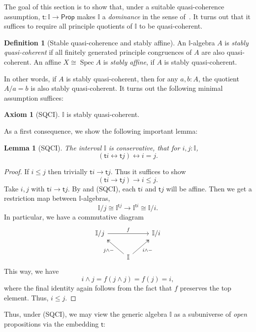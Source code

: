 \documentclass[12pt]{amsart}
\newtheorem{lemma}[theorem]{Lemma}
\theoremstyle{definition}
\newtheorem{definition}[theorem]{Definition}
\newtheorem*{axiom}{Axiom}
\newcommand{\mbb}[1]{\mathbb{#1}}
\newcommand{\I}{\mbb I}
\newcommand{\ms}[1]{\mathsf{#1}}
\newcommand{\eq}{\leftrightarrow}
\newcommand{\pp}{\ms{Prop}}
\newcommand{\spec}{\operatorname{Spec}}
\begin{document}
The goal of this section is to show that, under a suitable quasi-coherence assumption, $\ms t : \I \to \pp$ makes $\I$ a \emph{dominance} in the sense of~\cite{rosolini1986continuity}. It turns out that it suffices to require all principle quotients of $\I$ to be quasi-coherent.

\begin{definition}[Stable quasi-coherence and stably affine]
  An $\I$-algebra $A$ is \emph{stably quasi-coherent} if all finitely generated principle congruences of $A$ are also quasi-coherent. An affine $X \cong \spec A$ is \emph{stably affine}, if $A$ is stably quasi-coherent.
\end{definition}

In other words, if $A$ is stably quasi-coherent, then for any $a,b:A$, the quotient $A/a=b$ is also stably quasi-coherent. It turns out the following minimal assumption suffices:

\begin{axiom}[SQCI]\label{ax:sqci}
  $\I$ is stably quasi-coherent.
\end{axiom}

As a first consequence, we show the following important lemma:

\begin{lemma}[SQCI]\label{lem:intconserve}
  The interval $\I$ is \emph{conservative}, that for $i,j : \I$,
  \[ (\ms ti \eq \ms tj) \eq i = j. \]
\end{lemma}
\begin{proof}
  If $i \le j$ then trivially $\ms ti \to \ms tj$. Thus it suffices to show
  \[ (\ms ti \to \ms tj) \to i \le j. \]
  Take $i,j$ with $\ms ti \to \ms tj$. By  and (SQCI), each $\ms ti$ and $\ms tj$ will be affine. Then we get a restriction map between $\I$-algebras,
  \[ \I/j \cong \I^{\ms tj} \to \I^{\ms ti} \cong \I/i. \]
  In particular, we have a commutative diagram
  \[
  \begin{tikzcd}
    \I/j \ar[rr, "f"] & & \I/i \\
    & \I \ar[ul, two heads, "j \wedge -"] \ar[ur, two heads, "i \wedge -"']
  \end{tikzcd}
  \]
  This way, we have
  \[ i \wedge j = f(j \wedge j) = f(j) = i, \]
  where the final identity again follows from the fact that $f$ preserves the top element. Thus, $i \le j$. 
\end{proof}

Thus, under (SQCI), we may view the generic algebra $\I$ as a subuniverse of \emph{open} propositions via the embedding $\ms t$:
\end{document}
